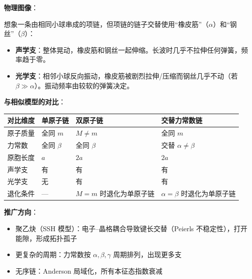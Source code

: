 \begin{insightbox}[物理图像与模型关联]
\textbf{物理图像}：

想象一条由相同小球串成的项链，但项链的链子交替使用``橡皮筋''（$\alpha$）和``钢丝''（$\beta$）：
\begin{itemize}[nosep]
    \item \textbf{声学支}：整体晃动，橡皮筋和钢丝一起伸缩。长波时几乎不拉伸任何弹簧，频率趋于零。
    \item \textbf{光学支}：相邻小球反向振动，橡皮筋被剧烈拉伸/压缩而钢丝几乎不动（若 $\beta\gg\alpha$）。振动频率由较软的弹簧决定。
\end{itemize}

\textbf{与相似模型的对比}：
\begin{center}
\begin{tabular}{llll}
\toprule
\textbf{对比维度} & \textbf{单原子链} & \textbf{双原子链} & \textbf{交替力常数链} \\
\midrule
原子质量 & 全同 $m$ & $M\neq m$ & 全同 $m$ \\
力常数 & 全同 $\beta$ & 全同 $\beta$ & 交替 $\alpha\neq\beta$ \\
原胞长度 & $a$ & $2a$ & $2a$ \\
声学支 & 有 & 有 & 有 \\
光学支 & 无 & 有 & 有 \\
退化条件 & --- & $M=m$ 时退化为单原子链 & $\alpha=\beta$ 时退化为单原子链 \\
\bottomrule
\end{tabular}
\end{center}

\textbf{推广方向}：
\begin{itemize}[nosep]
    \item 聚乙炔（SSH 模型）：电子--晶格耦合导致键长交替（Peierls 不稳定性），打开能隙，形成拓扑孤子
    \item 更复杂的周期：力常数按 $\alpha,\beta,\gamma$ 周期排列，出现更多支
    \item 无序链：Anderson 局域化，所有本征态指数衰减
\end{itemize}
\end{insightbox}

